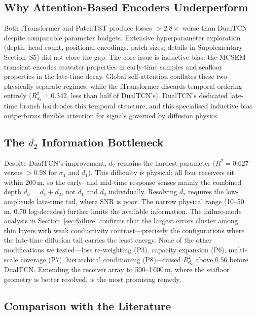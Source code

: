 \documentclass[journal]{IEEEtran}
\begin{document}
\subsection{Why Attention-Based Encoders Underperform}
\label{sec:transformer_discussion}

Both iTransformer and PatchTST produce losses $> 2.8\times$ worse
than DualTCN despite comparable parameter budgets.  Extensive
hyperparameter exploration (depth, head count, positional encodings,
patch sizes; details in Supplementary Section~S5) did not close the
gap.  The core issue is inductive bias: the MCSEM transient encodes
seawater properties in early-time samples and seafloor properties in
the late-time decay.  Global self-attention conflates these two
physically separate regimes, while the iTransformer discards temporal
ordering entirely ($R^2_{d_2} = 0.342$, less than half of DualTCN's).
DualTCN's dedicated late-time branch hardcodes this temporal
structure, and this specialised inductive bias outperforms flexible
attention for signals governed by diffusion physics.

\subsection{The $d_2$ Information Bottleneck}
\label{sec:d2_bottleneck}

Despite DualTCN's improvement, $d_2$ remains the hardest parameter
($R^2 = 0.627$ versus $> 0.98$ for $\sigma_1$ and $d_1$). This
difficulty is physical: all four receivers sit within 200\,m, so the
early- and mid-time response senses mainly the combined depth
$d_\mathrm{sf} = d_1 + d_2$, not $d_1$ and $d_2$ individually.
Resolving $d_2$ requires the low-amplitude late-time tail, where SNR
is poor. The narrow physical range (10--50\,m, 0.70 log-decades)
further limits the available information. The failure-mode analysis
in Section~\ref{sec:failure} confirms that the largest errors cluster
among thin layers with weak conductivity contrast---precisely the
configurations where the late-time diffusion tail carries the least
energy. None of the other modifications we tested---loss re-weighting
(P3), capacity expansion (P6), multi-scale coverage (P7),
hierarchical conditioning (P8)---raised $R^2_{d_2}$ above 0.56
before DualTCN. Extending the receiver array to 500--1\,000\,m,
where the seafloor geometry is better resolved, is the most promising
remedy.

\subsection{Comparison with the Literature}
\label{sec:lit_comparison}
\end{document}
